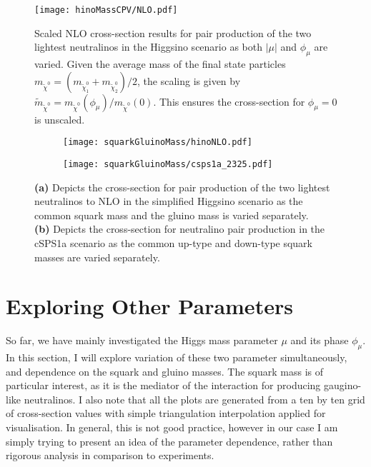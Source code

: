 \documentclass[../main.tex]{subfiles}
\begin{document}
\begin{figure}[ht!]
  \centering
  \texttt{[image: hinoMassCPV/NLO.pdf]}
  \caption{Scaled NLO cross-section results for pair production of the two lightest neutralinos in the Higgsino scenario as both \(|\mu|\) and \(\phi_\mu\) are varied.
  Given the average mass of the final state particles \(m_{\tilde\chi^0} = (m_{\tilde\chi^0_1}+m_{\tilde\chi^0_2})/2\), the scaling is given by \(\tilde{m}_{\tilde\chi^0} = m_{\tilde\chi^0}(\phi_\mu) / m_{\tilde\chi^0}(0)\). This ensures the cross-section for \(\phi_\mu = 0\) is unscaled.}
  \label{res:fig:hinoMassCPV}
\end{figure}
\begin{figure}[ht!]
  \centering
  \begin{subfigure}{0.49\textwidth}
    \centering
    \texttt{[image: squarkGluinoMass/hinoNLO.pdf]}
    \caption{}
  \end{subfigure}
  \begin{subfigure}{0.49\textwidth}
    \centering
    \texttt{[image: squarkGluinoMass/csps1a\_2325.pdf]}
    \caption{}
  \end{subfigure}
  \caption{\textbf{(a)} Depicts the cross-section for pair production of the two lightest neutralinos to NLO in the simplified Higgsino scenario as the common squark mass and the gluino mass is varied separately.\\
    \textbf{(b)} Depicts the cross-section for neutralino pair production in the cSPS1a scenario as the common up-type and down-type squark masses are varied separately.}
  \label{res:fig:squarkGluinoMass}
\end{figure}
\section{Exploring Other Parameters}
So far, we have mainly investigated the Higgs mass parameter \(\mu\) and its phase \(\phi_\mu\).
In this section, I  will explore variation of these two parameter simultaneously, and dependence on the squark and gluino masses.
The squark mass is of particular interest, as it is the mediator of the interaction for producing gaugino-like neutralinos.
I also note that all the plots are generated from a ten by ten grid of cross-section values with simple triangulation interpolation applied for visualisation.
In general, this is not good practice, however in our case I am simply trying to present an idea of the parameter dependence, rather than rigorous analysis in comparison to experiments.
\end{document}
